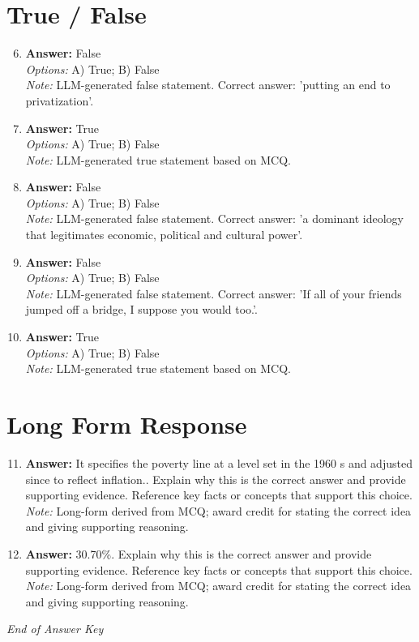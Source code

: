 \documentclass[12pt]{article}
\begin{document}
\section*{True / False}
\begin{enumerate}[label=\arabic*.]
\setcounter{enumi}{5}
\item \textbf{Answer:} False
\\ \textit{Options:} A) True; B) False
\\ \textit{Note:} LLM-generated false statement. Correct answer: 'putting an end to privatization'.
\item \textbf{Answer:} True
\\ \textit{Options:} A) True; B) False
\\ \textit{Note:} LLM-generated true statement based on MCQ.
\item \textbf{Answer:} False
\\ \textit{Options:} A) True; B) False
\\ \textit{Note:} LLM-generated false statement. Correct answer: 'a dominant ideology that legitimates economic, political and cultural power'.
\item \textbf{Answer:} False
\\ \textit{Options:} A) True; B) False
\\ \textit{Note:} LLM-generated false statement. Correct answer: 'If all of your friends jumped off a bridge, I suppose you would too.'.
\item \textbf{Answer:} True
\\ \textit{Options:} A) True; B) False
\\ \textit{Note:} LLM-generated true statement based on MCQ.
\end{enumerate}

\section*{Long Form Response}
\begin{enumerate}[label=\arabic*.]
\setcounter{enumi}{10}
\item \textbf{Answer:} It specifies the poverty line at a level set in the 1960 s and adjusted since to reflect inflation.. Explain why this is the correct answer and provide supporting evidence. Reference key facts or concepts that support this choice.
\\ \textit{Note:} Long-form derived from MCQ; award credit for stating the correct idea and giving supporting reasoning.
\item \textbf{Answer:} 30.70\%. Explain why this is the correct answer and provide supporting evidence. Reference key facts or concepts that support this choice.
\\ \textit{Note:} Long-form derived from MCQ; award credit for stating the correct idea and giving supporting reasoning.
\end{enumerate}

\vfill
\noindent\textit{End of Answer Key}
\end{document}
